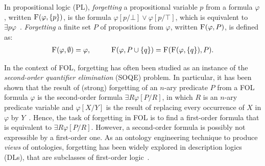 \documentclass[twoside,11pt]{article}
\begin{document}
In propositional logic (PL), {\em forgetting} a propositional variable $p$
from a  formula $\varphi$, written $\textsc{F}(\varphi,\{p\})$, is the formula $\varphi[p/\bot] \vee \varphi[p/\top]$,
which is equivalent to $\exists p\varphi$~\cite{lin1994forget}.
%
{\em Forgetting} a finite set $P$ of propositions from $\varphi$, written $\textsc{F}(\varphi, P)$, is defined as: %
\begin{alignat}{2}
      &  \Forget(\varphi, \emptyset) = \varphi, \qquad %
      &  \Forget(\varphi, P \cup \{q\})  = \Forget(\Forget(\varphi, \{q\}), P).
      \nonumber
\end{alignat}

In the context of FOL, forgetting has often been studied as an instance of the \emph{second-order quantifier elimination} (SOQE) problem. In particular, it has been shown that the result of (strong) forgetting of an $n$-ary predicate $P$ from a FOL formula $\varphi$ is the second-order formula $\exists R \varphi[P/R]$, in which $R$ is an $n$-ary predicate variable and $\varphi[X/Y]$ is the result of replacing every occurrence of $X$ in $\varphi$ by $Y$~\cite{lin1994forget}.
Hence, the task of forgetting in FOL is to find a first-order formula that is equivalent to $\exists R \varphi[P/R]$.
However, a second-order formula is possibly not expressible by a first-order one.
As an ontology engineering technique to produce {\em views} of ontologies,
forgetting has been widely explored in description logics (DLs), that are subclasses of first-order logic~\cite{Wang:AMAI:2010,Lutz:IJCAI:2011,Konev:JAIR:2012,Zhao:2017:IJCAI,DBLP:conf/aaai/ZhaoSWZF20}.


\end{document}
